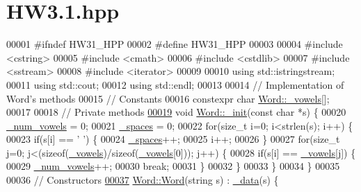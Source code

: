 \hypertarget{HW3_81_8hpp_source}{}\section{H\+W3.1.hpp}

\begin{DoxyCode}
00001 \textcolor{preprocessor}{#ifndef HW31\_HPP}
00002 \textcolor{preprocessor}{#define HW31\_HPP}
00003 
00004 \textcolor{preprocessor}{#include <cstring>}
00005 \textcolor{preprocessor}{#include <cmath>}
00006 \textcolor{preprocessor}{#include <cstdlib>}
00007 \textcolor{preprocessor}{#include <sstream>}
00008 \textcolor{preprocessor}{#include <iterator>}
00009 
00010 \textcolor{keyword}{using} std::istringstream;
00011 \textcolor{keyword}{using} std::cout;
00012 \textcolor{keyword}{using} std::endl;
00013 
00014 \textcolor{comment}{// Implementation of Word's methods}
00015 \textcolor{comment}{// Constants}
00016 constexpr \textcolor{keywordtype}{char} \hyperlink{classWord_a5c77b083065c497224d3ad4b0b5958de}{Word::\_vowels}[];
00017 
00018 \textcolor{comment}{// Private methods}
\hypertarget{HW3_81_8hpp_source.tex_l00019}{}\hyperlink{classWord_a6a557d92243a1a4aa0f7a874b3c66a22}{00019} \textcolor{keywordtype}{void} \hyperlink{classWord_a6a557d92243a1a4aa0f7a874b3c66a22}{Word::\_init}(\textcolor{keyword}{const} \textcolor{keywordtype}{char} *s) \{
00020     \hyperlink{classWord_a95a4914370c936b524ab21ff42177fb8}{\_num\_vowels} = 0;
00021     \hyperlink{classWord_afffea82d937c3486011b409bcff4c938}{\_spaces} = 0;
00022     \textcolor{keywordflow}{for}(\textcolor{keywordtype}{size\_t} i=0; i<strlen(s); i++) \{
00023         \textcolor{keywordflow}{if}(s[i] == \textcolor{charliteral}{' '}) \{
00024             \hyperlink{classWord_afffea82d937c3486011b409bcff4c938}{\_spaces}++;
00025             i++;
00026         \}
00027         \textcolor{keywordflow}{for}(\textcolor{keywordtype}{size\_t} j=0; j<(\textcolor{keyword}{sizeof}(\hyperlink{classWord_a5c77b083065c497224d3ad4b0b5958de}{\_vowels})/\textcolor{keyword}{sizeof}(\hyperlink{classWord_a5c77b083065c497224d3ad4b0b5958de}{\_vowels}[0])); j++) \{
00028             \textcolor{keywordflow}{if}(s[i] == \hyperlink{classWord_a5c77b083065c497224d3ad4b0b5958de}{\_vowels}[j]) \{
00029                 \hyperlink{classWord_a95a4914370c936b524ab21ff42177fb8}{\_num\_vowels}++;
00030                 \textcolor{keywordflow}{break};
00031             \}
00032         \}
00033     \}
00034 \}
00035 
00036 \textcolor{comment}{// Constructors}
\hypertarget{HW3_81_8hpp_source.tex_l00037}{}\hyperlink{classWord_a86290013f4b538ae7aeef2720fc240ee}{00037} \hyperlink{classWord_a17baf7109d46beb48d5b469f3baedc48}{Word::Word}(\textcolor{keywordtype}{string} s) : \hyperlink{classWord_adc46545d81f0158074f941731ae5bb52}{\_data}(s) \{

\end{DoxyCode}
